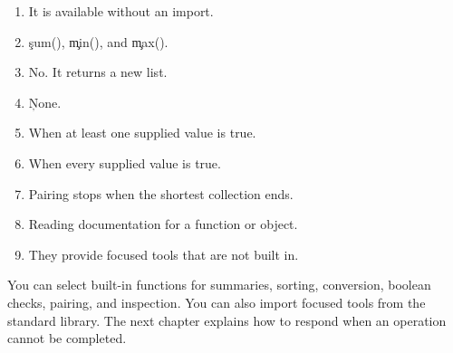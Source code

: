 
\begin{enumerate}
    \item It is available without an import.
    \item \c{sum()}, \c{min()}, and \c{max()}.
    \item No. It returns a new list.
    \item \c{None}.
    \item When at least one supplied value is true.
    \item When every supplied value is true.
    \item Pairing stops when the shortest collection ends.
    \item Reading documentation for a function or object.
    \item They provide focused tools that are not built in.
\end{enumerate}

\begin{tcolorbox}[title=Chapter summary,colframe=orange,colback=white,arc=2mm]
You can select built-in functions for summaries, sorting, conversion, boolean
checks, pairing, and inspection. You can also import focused tools from the
standard library. The next chapter explains how to respond when an operation
cannot be completed.
\end{tcolorbox}

